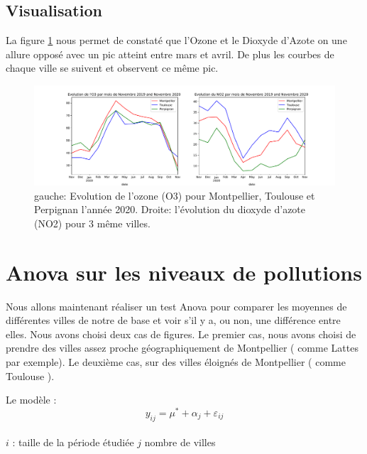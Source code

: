 \documentclass[a4paper,11pt,twoside,openright]{report}
\theoremstyle{plain}
\theoremstyle{definition}
\theoremstyle{remark}
\begin{document}
\section{Visualisation}
\label{sec:visualisation}

La figure \ref{fig:Evo} nous permet de constaté que l'Ozone et le Dioxyde d'Azote on une allure opposé avec un pic atteint entre mars et avril. De plus les courbes de chaque ville se suivent et observent ce même pic.
\begin{figure}
  \centering
  \includegraphics[width=\textwidth]{Evolution_O3_NO2.pdf}
  \caption[Titre plus synthétique aller voir comme il diffère du titre
  original.]{gauche: Evolution de l'ozone (O3) pour Montpellier, Toulouse et Perpignan l'année 2020. Droite: l'évolution du dioxyde d'azote (NO2) pour 3 même villes.  }
  \label{fig:Evo}
\end{figure}


\chapter{Anova sur les niveaux de pollutions}
\label{cha:Anova}

Nous allons maintenant réaliser un test Anova pour comparer les moyennes de différentes villes de notre de base et voir s'il y a, ou non, une différence entre elles. Nous avons choisi deux cas de figures. Le premier cas, nous avons choisi de prendre des villes assez proche géographiquement de Montpellier ( comme Lattes par exemple). Le deuxième cas, sur des villes éloignés de Montpellier ( comme Toulouse ).

Le modèle :  \[y_{ij}=\mu^*+ \alpha_j+\varepsilon_{ij}\]\\
$i$ : taille de la période étudiée
$j$  nombre de villes \\
\end{document}
